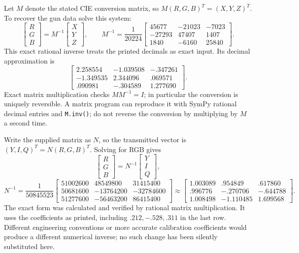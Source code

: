 Let $M$ denote the stated CIE conversion matrix, so
$M(R,G,B)^T=(X,Y,Z)^T$. To recover the gun data solve this system:
\[
 \boxed{\begin{bmatrix}R\\G\\B\end{bmatrix}
 =M^{-1}\begin{bmatrix}X\\Y\\Z\end{bmatrix}},\qquad
 M^{-1}=\frac1{20224}
 \begin{bmatrix}45677&-21023&-7023\\-27293&47407&1407\\1840&-6160&25840\end{bmatrix}.
\]
This exact rational inverse treats the printed decimals as exact input.
Its decimal approximation is
\[
 \begin{bmatrix}2.258554&-1.039508&-.347261\\
 -1.349535&2.344096&.069571\\.090981&-.304589&1.277690\end{bmatrix}.
\]
Exact matrix multiplication checks $MM^{-1}=I$; in particular the
conversion is uniquely reversible. A matrix program can reproduce it with
SymPy rational decimal entries and \texttt{M.inv()}; do not reverse the
conversion by multiplying by $M$ a second time.

Write the supplied matrix as $N$, so the transmitted vector is
$(Y,I,Q)^T=N(R,G,B)^T$. Solving for RGB gives
\[
 \boxed{\begin{bmatrix}R\\G\\B\end{bmatrix}
 =N^{-1}\begin{bmatrix}Y\\I\\Q\end{bmatrix}},
\]
\[
 N^{-1}=\frac1{50845523}
 \begin{bmatrix}
 51002600&48549800&31415400\\
 50681600&-13764200&-32784600\\
 51277600&-56463200&86415400
 \end{bmatrix}
 \approx\begin{bmatrix}
 1.003089&.954849&.617860\\
 .996776&-.270706&-.644788\\
 1.008498&-1.110485&1.699568
 \end{bmatrix}.
\]
The exact form was calculated and verified by rational matrix multiplication.
It uses the coefficients as printed, including $.212,-.528,.311$ in the
last row. Different engineering conventions or more accurate calibration
coefficients would produce a different numerical inverse; no such change
has been silently substituted here.
